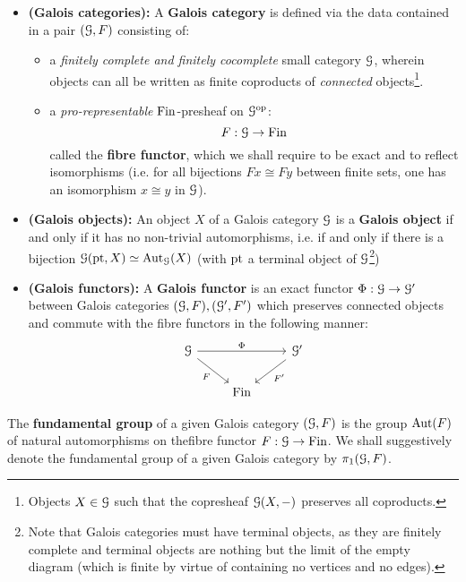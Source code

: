         \begin{definition} \label{def: galois_categories}
            \noindent
            \begin{itemize}
                \item \textbf{(Galois categories):} A \textbf{Galois category} is defined via the data contained in a pair $(\mathcal{G}, F)$ consisting of:
                \begin{itemize}
                    \item a \textit{finitely complete and finitely cocomplete} small category $\mathcal{G}$, wherein objects can all be written as finite coproducts of \textit{connected} objects\footnote{Objects $X \in \mathcal{G}$ such that the copresheaf $\mathcal{G}(X, -)$ preserves all coproducts.}.
                    \item a \textit{pro-representable} $\mathrm{Fin}$-presheaf on $\mathcal{G}^{\mathrm{op}}$:
                        $$F: \mathcal{G} \to \mathrm{Fin}$$
                    called the \textbf{fibre functor}, which we shall require to be exact and to reflect isomorphisms (i.e. for all bijections $Fx \cong Fy$ between finite sets, one has an isomorphism $x \cong y$ in $\mathcal{G}$).
                \end{itemize}
                \item \textbf{(Galois objects):} An object $X$ of a Galois category $\mathcal{G}$ is a \textbf{Galois object} if and only if it has no non-trivial automorphisms, i.e. if and only if there is a bijection $\mathcal{G}(\mathrm{pt}, X) \simeq \mathrm{Aut}_{\mathcal{G}}(X)$ (with $\mathrm{pt}$ a terminal object of $\mathcal{G}$\footnote{Note that Galois categories must have terminal objects, as they are finitely complete and terminal objects are nothing but the limit of the empty diagram (which is finite by virtue of containing no vertices and no edges).})
                \item \textbf{(Galois functors):} A \textbf{Galois functor} is an exact functor $\Phi: \mathcal{G} \to \mathcal{G}'$ between Galois categories $(\mathcal{G}, F), (\mathcal{G}', F')$ which preserves connected objects and commute with the fibre functors in the following manner:
                    $$
                        \begin{tikzcd}
                        	\calG && {\calG'} \\
                        	& \Fin
                        	\arrow["F"', from=1-1, to=2-2]
                        	\arrow["{F'}", from=1-3, to=2-2]
                        	\arrow["\Phi", from=1-1, to=1-3]
                        \end{tikzcd}
                    $$
            \end{itemize}
        \end{definition}
        \begin{definition} \label{def: fundamental_groups_of_galois_categories}
            The \textbf{fundamental group} of a given Galois category $(\mathcal{G}, F)$ is the group $\mathrm{Aut}(F)$ of natural automorphisms on thefibre functor $F: \mathcal{G} \to \mathrm{Fin}$. We shall suggestively denote the fundamental group of a given Galois category by $\pi_1(\mathcal{G}, F)$.
        \end{definition}
        
